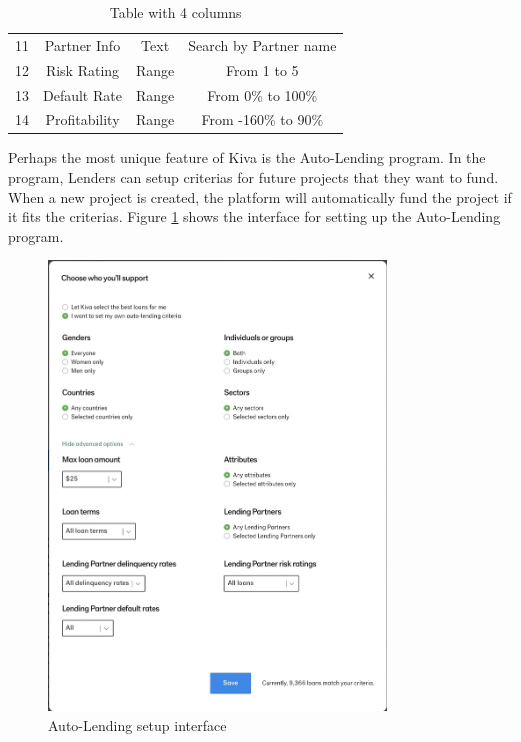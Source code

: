 \begin{table}[H]
{\begin{tabular}{|c|c|c|c|}
			11 & Partner Info                  & Text            & Search by Partner name                                                                                                  \\
			12 & Risk Rating                   & Range           & From 1 to 5                                                                                                             \\
			13 & Default Rate                  & Range           & From 0\% to 100\%                                                                                                       \\
			14 & Profitability                 & Range           & From -160\% to 90\%                                                                                                     \\
			\hline
		\end{tabular}%
	}
	\caption{Table with 4 columns \cite{kiva-browse}}
	\label{tab:browser-criteria}
\end{table}

Perhaps the most unique feature of Kiva is the Auto-Lending program.
In the program, Lenders can setup criterias for future projects that they want to fund.
When a new project is created, the platform will automatically fund the project if it fits the criterias.
Figure \ref{fig:auto-lend-setup} shows the interface for setting up the Auto-Lending program.

\begin{figure}[H]
	\centering
	\includegraphics[width=0.8\textwidth]{images/auto-lend-setup.png}
	\caption{Auto-Lending setup interface \cite{kiva-autolend2}}
	\label{fig:auto-lend-setup}
\end{figure}

